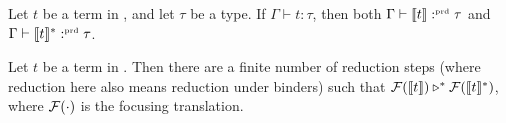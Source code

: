 \begin{theorem}
  Let $t$ be a term in \surfacelang, and let $\tau$ be a type.
  If $\Gamma \vdash t: \tau$, then both $\Gamma \vdash \llbracket t \rrbracket :^{\text{\tiny prd}} \tau$ and $\Gamma \vdash \llbracket t \rrbracket_{}^{\ast} :^{\text{\tiny prd}} \tau$.
\end{theorem}

\begin{theorem}[Correctness]
  Let $t$ be a term in \surfacelang. Then there are a finite number of reduction steps (where reduction here also means reduction under binders) such that $\mathcal{F}(\llbracket t \rrbracket) \triangleright^{\ast} \mathcal{F}(\llbracket t \rrbracket_{}^{\ast})$, where $\mathcal{F}(\cdot)$ is the focusing translation.
\end{theorem}
